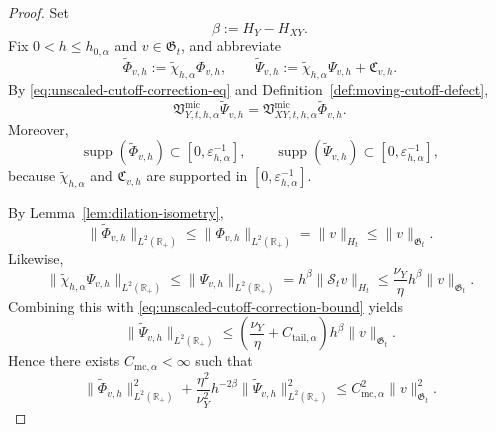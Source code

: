 \documentclass[11pt,a4paper]{amsart}
\theoremstyle{plain}
\theoremstyle{definition}
\theoremstyle{remark}
\newcommand{\R}{\mathbb{R}}
\begin{document}
\begin{proof}
Set
\[
\beta:=H_Y-H_{XY}.
\]
Fix \(0<h\le h_{0,\alpha}\) and \(v\in\mathfrak G_t\), and abbreviate
\[
\widetilde\Phi_{v,h}:=\widetilde\chi_{h,\alpha}\Phi_{v,h},
\qquad
\widetilde\Psi_{v,h}:=
\widetilde\chi_{h,\alpha}\Psi_{v,h}
+
\mathfrak C_{v,h}.
\]
By \eqref{eq:unscaled-cutoff-correction-eq} and
Definition~\ref{def:moving-cutoff-defect},
\[
\mathfrak V_{Y,t,h,\alpha}^{\mathrm{mic}}\widetilde\Psi_{v,h}
=
\mathfrak V_{XY,t,h,\alpha}^{\mathrm{mic}}\widetilde\Phi_{v,h}.
\]
Moreover,
\[
\operatorname{supp}(\widetilde\Phi_{v,h})
\subset[0,\varepsilon_{h,\alpha}^{-1}],
\qquad
\operatorname{supp}(\widetilde\Psi_{v,h})
\subset[0,\varepsilon_{h,\alpha}^{-1}],
\]
because \(\widetilde\chi_{h,\alpha}\) and \(\mathfrak C_{v,h}\) are supported in
\([0,\varepsilon_{h,\alpha}^{-1}]\).

By Lemma~\ref{lem:dilation-isometry},
\[
\|\widetilde\Phi_{v,h}\|_{L^2(\R_+)}
\le
\|\Phi_{v,h}\|_{L^2(\R_+)}
=
\|v\|_{H_t}
\le
\|v\|_{\mathfrak G_t}.
\]
Likewise,
\[
\|\widetilde\chi_{h,\alpha}\Psi_{v,h}\|_{L^2(\R_+)}
\le
\|\Psi_{v,h}\|_{L^2(\R_+)}
=
h^\beta\|\mathcal S_t v\|_{H_t}
\le
\frac{\nu_Y}{\eta}h^\beta\|v\|_{\mathfrak G_t}.
\]
Combining this with \eqref{eq:unscaled-cutoff-correction-bound} yields
\begin{equation}\label{eq:unscaled-cutoff-output-bound}
\|\widetilde\Psi_{v,h}\|_{L^2(\R_+)}
\le
\left(
\frac{\nu_Y}{\eta}
+
C_{\mathrm{tail},\alpha}
\right)
h^\beta\|v\|_{\mathfrak G_t}.
\end{equation}
Hence there exists \(C_{\mathrm{mc},\alpha}<\infty\) such that
\begin{equation}\label{eq:unscaled-cutoff-micro-bound}
\|\widetilde\Phi_{v,h}\|_{L^2(\R_+)}^2
+
\frac{\eta^2}{\nu_Y^2}
h^{-2\beta}
\|\widetilde\Psi_{v,h}\|_{L^2(\R_+)}^2
\le
C_{\mathrm{mc},\alpha}^2\|v\|_{\mathfrak G_t}^2.
\end{equation}


\end{proof}
\end{document}

